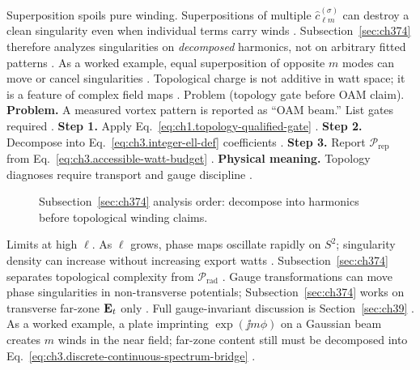 Superposition spoils pure winding. Superpositions of multiple \(\widehat{c}_{\ell m}^{(\sigma)}\) can destroy a clean singularity even when individual terms
carry winds \cite{harrington2001}. Subsection~\ref{sec:ch374} therefore analyzes singularities on
\emph{decomposed} harmonics, not on arbitrary fitted patterns \cite{harrington2001}.
As a worked example, equal superposition of opposite \(m\) modes can move or cancel singularities \cite{allen1992}.
Topological charge is not additive in watt space; it is a feature of complex field maps \cite{stratton1941}.
Problem (topology gate before OAM claim). \textbf{Problem.} A measured vortex pattern is reported as ``OAM beam.'' List gates required
\cite{belinfante1940}.
\textbf{Step 1.} Apply Eq.~\eqref{eq:ch1.topology-qualified-gate} \cite{stratton1941}.
\textbf{Step 2.} Decompose into Eq.~\eqref{eq:ch3.integer-ell-def} coefficients \cite{hansen1988}.
\textbf{Step 3.} Report \(\mathcal{P}_{\mathrm{rep}}\) from Eq.~\eqref{eq:ch3.accessible-watt-budget} \cite{harrington2001}.
\textbf{Physical meaning.} Topology diagnoses require transport and gauge discipline \cite{belinfante1940}.
\begin{figure}[t]
\centering
{}
\caption{Subsection~\ref{sec:ch374} analysis order: decompose into harmonics before topological winding claims.}
\label{fig:ch3.374-decompose-first}
\end{figure}
Limits at high \(\ell\). As \(\ell\) grows, phase maps oscillate rapidly on \(S^{2}\); singularity density can increase without increasing export
watts \cite{hansen1988}. Subsection~\ref{sec:ch374} separates topological complexity from
\(\mathcal{P}_{\mathrm{rad}}\) \cite{poynting1884}.
Gauge transformations can move phase singularities in non-transverse potentials; Subsection~\ref{sec:ch374} works on
transverse far-zone \(\mathbf{E}_{t}\) only \cite{belinfante1940}. Full gauge-invariant discussion is Section~\ref{sec:ch39}
\cite{belinfante1940}.
As a worked example, a plate imprinting \(\exp(\jj m\phi)\) on a Gaussian beam creates \(m\) winds in the near field; far-zone content still
must be decomposed into Eq.~\eqref{eq:ch3.discrete-continuous-spectrum-bridge} \cite{allen1992}.
